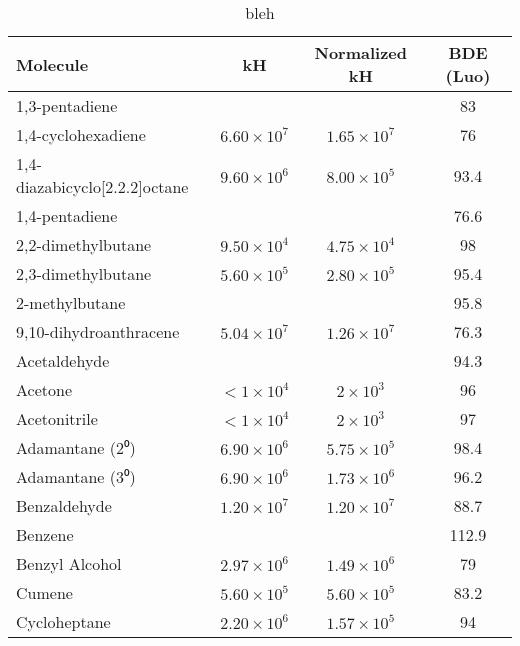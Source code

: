 \begin{center}
\begin{longtable}{l | c c c}
\caption{bleh} \label{tab:expt-bde} \\
 Molecule                       & kH           & Normalized kH & BDE (Luo) \\
\hline
 1,3-pentadiene                 &                &                &        83 \\
 1,4-cyclohexadiene             & $ 6.60 \times 10^7$ & $1.65 \times 10^7 $ &        76 \\
 1,4-diazabicyclo[2.2.2]octane  & $ 9.60 \times 10^6$ & $8.00 \times 10^5 $ &      93.4 \\
 1,4-pentadiene                 & $            $ & $            $ &      76.6 \\
 2,2-dimethylbutane             & $ 9.50 \times 10^4$ & $4.75 \times 10^4 $ &        98 \\
 2,3-dimethylbutane             & $ 5.60 \times 10^5$ & $2.80 \times 10^5 $ &      95.4 \\
 2-methylbutane                 & $            $ & $            $ &      95.8 \\
 9,10-dihydroanthracene         & $ 5.04 \times 10^7$ & $1.26 \times 10^7 $ &      76.3 \\
 Acetaldehyde                   & $            $ & $            $ &      94.3 \\
 Acetone                        & $ < 1 \times 10^4 $ & $2 \times 10^3    $ &        96 \\
 Acetonitrile                   & $ < 1 \times 10^4 $ & $2 \times 10^3    $ &        97 \\
 Adamantane (2⁰)                & $ 6.90 \times 10^6$ & $5.75 \times 10^5 $ &      98.4 \\
 Adamantane (3⁰)                & $ 6.90 \times 10^6$ & $1.73 \times 10^6 $ &      96.2 \\
 Benzaldehyde                   & $ 1.20 \times 10^7$ & $1.20 \times 10^7 $ &      88.7 \\
 Benzene                        & $            $ & $            $ &     112.9 \\
 Benzyl Alcohol                 & $ 2.97 \times 10^6$ & $1.49 \times 10^6 $ &        79 \\
 Cumene                         & $ 5.60 \times 10^5$ & $5.60 \times 10^5 $ &      83.2 \\
 Cycloheptane                   & $ 2.20 \times 10^6$ & $1.57 \times 10^5 $ &        94 \\

\end{longtable}
\end{center}
